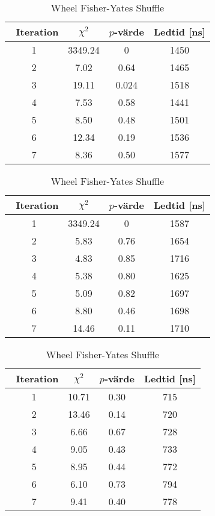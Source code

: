 \begin{table}[H]
	\vspace{2em}

	\begin{subtable}[h]{0.45\textwidth}
		\centering
		\caption{\gls{soc} Pile Shuffle}
		\label{tab:soc}
		\begin{tabular}{c|c|c|c}
			$\phantom{\bigg|}$ Iteration & $\chi^2$  & \(p\)-värde & Ledtid [ns]

			\\ \hline \hline
			1 & 3349.24 & 0 & 1450 
			\\ \hline
			2 & 7.02 & 0.64 & 1465 
			\\ \hline
			3 & 19.11 & 0.024 & 1518
			\\ \hline
			4 & 7.53 & 0.58 & 1441 
			\\ \hline
			5 & 8.50 & 0.48 & 1501 
			\\ \hline
			6 & 12.34 & 0.19 & 1536 
			\\ \hline
			7 & 8.36 & 0.50 & 1577 
		\end{tabular}
	\end{subtable}
	\hfill
	\begin{subtable}[h]{0.45\textwidth}
		\centering
		\caption{Ten Pile Shuffle}
		\label{tab:ten}
		\begin{tabular}{c|c|c|c}
			$\phantom{\bigg|}$ Iteration & $\chi^2$  & \(p\)-värde & Ledtid [ns]

			\\ \hline \hline
			1 & 3349.24 & 0 & 1587 
			\\ \hline
			2 & 5.83 & 0.76 & 1654 
			\\ \hline
			3 & 4.83 & 0.85 & 1716
			\\ \hline
			4 & 5.38 & 0.80 & 1625 
			\\ \hline
			5 & 5.09 & 0.82 & 1697 
			\\ \hline
			6 & 8.80 & 0.46 & 1698 
			\\ \hline
			7 & 14.46 & 0.11 & 1710 
		\end{tabular}
	\end{subtable}
	\vspace{2em}

	\begin{subtable}[h]{0.45\textwidth}
		\centering
		\caption{Wheel Fisher-Yates Shuffle}
		\label{tab:wheel}
		\begin{tabular}{c|c|c|c}
			$\phantom{\bigg|}$ Iteration & $\chi^2$  & \(p\)-värde & Ledtid [ns]

			\\ \hline \hline
			1 & 10.71 & 0.30 & 715 
			\\ \hline
			2 & 13.46 & 0.14 & 720 
			\\ \hline
			3 & 6.66 & 0.67 & 728
			\\ \hline
			4 & 9.05 & 0.43 & 733 
			\\ \hline
			5 & 8.95 & 0.44 & 772 
			\\ \hline
			6 & 6.10 & 0.73 & 794 
			\\ \hline
			7 & 9.41 & 0.40 & 778 
		\end{tabular}
	\end{subtable}
\end{table}
